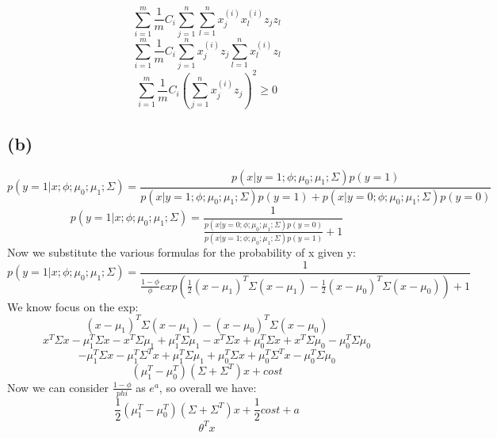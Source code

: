 \documentclass[11pt]{article}
\begin{document}
\begin{equation}
    \sum\limits_{i=1}^{m}\frac{1}{m}C_{i}\sum\limits_{j=1}^{n}\sum\limits_{l=1}^{n}x_{j}^{(i)}x_{l}^{(i)}z_{j}z_{l}
\end{equation}
\begin{equation}
    \sum\limits_{i=1}^{m}\frac{1}{m}C_{i}\sum\limits_{j=1}^{n}x_{j}^{(i)}z_{j}\sum\limits_{l=1}^{n}x_{l}^{(i)}z_{l}
\end{equation}
\begin{equation}
    \sum\limits_{i=1}^{m}\frac{1}{m}C_{i}(\sum\limits_{j=1}^{n}x_{j}^{(i)}z_{j})^{2} \geq 0
\end{equation}
\subsection{(b)}
\begin{equation*}
    p(y = 1|x;\phi;\mu_{0};\mu_{1};\Sigma) = \frac{p(x|y=1;\phi;\mu_{0};\mu_{1};\Sigma)p(y=1)}{p(x|y=1;\phi;\mu_{0};\mu_{1};\Sigma)p(y=1)+p(x|y=0;\phi;\mu_{0};\mu_{1};\Sigma)p(y=0)}
\end{equation*}
\begin{equation}
      p(y = 1|x;\phi;\mu_{0};\mu_{1};\Sigma) = \frac{1}{\frac{p(x|y=0;\phi;\mu_{0};\mu_{1};\Sigma)p(y=0)}{p(x|y=1;\phi;\mu_{0};\mu_{1};\Sigma)p(y=1)}+1}
\end{equation}
Now we substitute the various formulas for the probability of x given y:
\begin{equation}
   p(y = 1|x;\phi;\mu_{0};\mu_{1};\Sigma)= 
   \frac{1}{\frac{1-\phi}{\phi}exp(\frac{1}{2}(x-\mu_{1})^{T}\Sigma(x-\mu_{1})-\frac{1}{2}(x-\mu_{0})^{T}\Sigma(x-\mu_{0}))+1}
\end{equation}
We know focus on the exp:
\begin{equation}
    (x-\mu_{1})^{T}\Sigma(x-\mu_{1})-(x-\mu_{0})^{T}\Sigma(x-\mu_{0})
\end{equation}
\begin{equation*}
    x^{T}\Sigma x-\mu_{1}^{T}\Sigma x-x^{T}\Sigma\mu_{1}+\mu_{1}^{T}\Sigma\mu_{1}-x^{T}\Sigma x+\mu_{0}^{T}\Sigma x+x^{T}\Sigma\mu_{0}-\mu_{0}^{T}\Sigma\mu_{0}
\end{equation*}
\begin{equation*}
    -\mu_{1}^{T}\Sigma x-\mu_{1}^{T}\Sigma^{T}x+\mu_{1}^{T}\Sigma\mu_{1}+\mu_{0}^{T}\Sigma x+\mu_{0}^{T}\Sigma^{T}x-\mu_{0}^{T}\Sigma\mu_{0}
\end{equation*}
\begin{equation*}
    (\mu_{1}^{T}-\mu_{0}^{T})(\Sigma+\Sigma^T)x+cost
\end{equation*}
Now we can consider $\frac{1-\phi}{phi}$ as $e^{a}$, so overall we have:
\begin{equation*}
    \frac{1}{2}(\mu_{1}^{T}-\mu_{0}^{T})(\Sigma+\Sigma^T)x+\frac{1}{2}cost+a
\end{equation*}
\begin{equation}
    \theta^{T}x
\end{equation}
\end{document}
